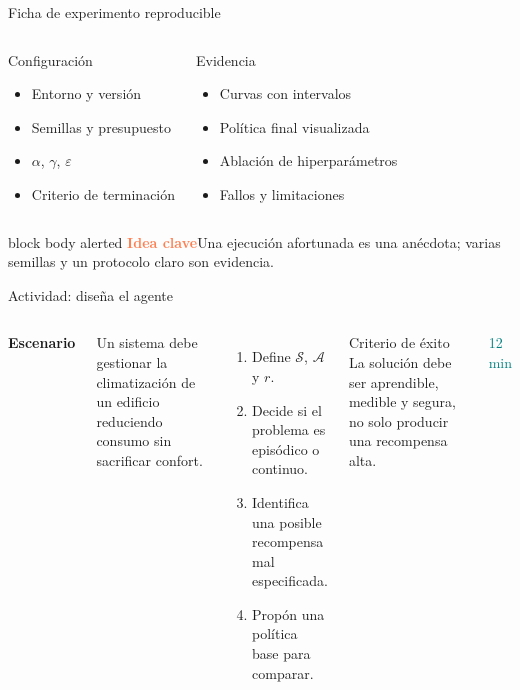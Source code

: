 \documentclass[aspectratio=169,10pt]{beamer}
\newcommand{\keyidea}[1]{%
  \begin{beamercolorbox}[rounded=true,sep=0.65em,wd=\linewidth]{block body alerted}
    \textcolor{Coral}{\bfseries Idea clave}\quad #1
  \end{beamercolorbox}%
}
\begin{document}
\begin{frame}{Ficha de experimento reproducible}
  \begin{columns}[T,onlytextwidth]
      \begin{block}{Configuración}
        \begin{itemize}
          \item Entorno y versión
          \item Semillas y presupuesto
          \item $\alpha$, $\gamma$, $\varepsilon$
          \item Criterio de terminación
        \end{itemize}
      \end{block}
      \begin{exampleblock}{Evidencia}
        \begin{itemize}
          \item Curvas con intervalos
          \item Política final visualizada
          \item Ablación de hiperparámetros
          \item Fallos y limitaciones
        \end{itemize}
      \end{exampleblock}
  \end{columns}

  \vspace{0.45cm}
  \keyidea{Una ejecución afortunada es una anécdota; varias semillas y un protocolo claro son evidencia.}
\end{frame}

\begin{frame}{Actividad: diseña el agente}
  \begin{columns}[T,onlytextwidth]
      \textbf{Escenario}\par
      Un sistema debe gestionar la climatización de un edificio reduciendo consumo sin sacrificar confort.

      \vspace{0.35cm}
      \begin{enumerate}
        \item Define $\mathcal{S}$, $\mathcal{A}$ y $r$.
        \item Decide si el problema es episódico o continuo.
        \item Identifica una posible recompensa mal especificada.
        \item Propón una política base para comparar.
      \end{enumerate}
      \begin{alertblock}{Criterio de éxito}
        La solución debe ser aprendible, medible y segura, no solo producir una recompensa alta.
      \end{alertblock}
      \vspace{0.3cm}
      \centering\Large\textcolor{Teal}{12 min}
  \end{columns}
\end{frame}
\end{document}
